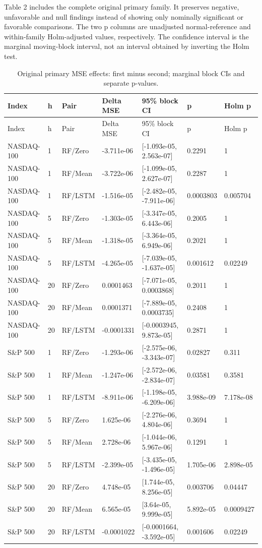 \documentclass[11pt]{article}
\begin{document}
Table 2 includes the complete original primary family. It preserves negative, unfavorable and null findings instead of showing only nominally significant or favorable comparisons. The two p columns are unadjusted normal-reference and within-family Holm-adjusted values, respectively. The confidence interval is the marginal moving-block interval, not an interval obtained by inverting the Holm test.


\Needspace{263pt}
{\footnotesize
\begin{longtable}{lllllll}
\caption{Original primary MSE effects: first minus second; marginal block CIs and separate p-values.}\\
\toprule
Index & h & Pair & Delta MSE & 95\% block CI & p & Holm p\\
\midrule\endfirsthead
\toprule
Index & h & Pair & Delta MSE & 95\% block CI & p & Holm p\\
\midrule\endhead
NASDAQ-100 & 1 & RF/Zero & -3.711e-06 & [-1.093e-05, 2.563e-07] & 0.2291 & 1\\
NASDAQ-100 & 1 & RF/Mean & -3.722e-06 & [-1.099e-05, 2.627e-07] & 0.2287 & 1\\
NASDAQ-100 & 1 & RF/LSTM & -1.516e-05 & [-2.482e-05, -7.911e-06] & 0.0003803 & 0.005704\\
NASDAQ-100 & 5 & RF/Zero & -1.303e-05 & [-3.347e-05, 6.443e-06] & 0.2005 & 1\\
NASDAQ-100 & 5 & RF/Mean & -1.318e-05 & [-3.364e-05, 6.949e-06] & 0.2021 & 1\\
NASDAQ-100 & 5 & RF/LSTM & -4.265e-05 & [-7.039e-05, -1.637e-05] & 0.001612 & 0.02249\\
NASDAQ-100 & 20 & RF/Zero & 0.0001463 & [-7.071e-05, 0.0003868] & 0.2011 & 1\\
NASDAQ-100 & 20 & RF/Mean & 0.0001371 & [-7.889e-05, 0.0003735] & 0.2408 & 1\\
NASDAQ-100 & 20 & RF/LSTM & -0.0001331 & [-0.0003945, 9.873e-05] & 0.2871 & 1\\
S\&P 500 & 1 & RF/Zero & -1.293e-06 & [-2.575e-06, -3.343e-07] & 0.02827 & 0.311\\
S\&P 500 & 1 & RF/Mean & -1.247e-06 & [-2.572e-06, -2.834e-07] & 0.03581 & 0.3581\\
S\&P 500 & 1 & RF/LSTM & -8.911e-06 & [-1.198e-05, -6.209e-06] & 3.988e-09 & 7.178e-08\\
S\&P 500 & 5 & RF/Zero & 1.625e-06 & [-2.276e-06, 4.804e-06] & 0.3694 & 1\\
S\&P 500 & 5 & RF/Mean & 2.728e-06 & [-1.044e-06, 5.967e-06] & 0.1291 & 1\\
S\&P 500 & 5 & RF/LSTM & -2.399e-05 & [-3.435e-05, -1.496e-05] & 1.705e-06 & 2.898e-05\\
S\&P 500 & 20 & RF/Zero & 4.748e-05 & [1.744e-05, 8.256e-05] & 0.003706 & 0.04447\\
S\&P 500 & 20 & RF/Mean & 6.565e-05 & [3.64e-05, 9.999e-05] & 5.892e-05 & 0.0009427\\
S\&P 500 & 20 & RF/LSTM & -0.0001022 & [-0.0001664, -3.592e-05] & 0.001606 & 0.02249\\
\bottomrule\end{longtable}}
\end{document}
